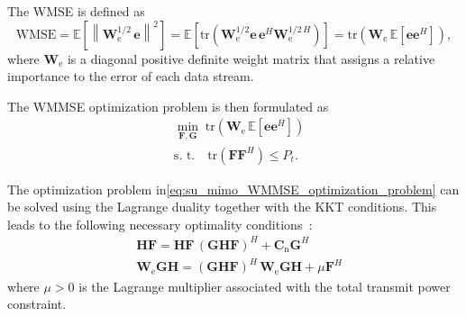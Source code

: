 The \ac{WMSE} is defined as
\begin{equation}
\label{eq:wmse_matrix}
    \text{WMSE} 
    = \mathbb{E}\!\left[ \left\|\mathbf{W}^{1/2}_{\mathrm{e}} \, \mathbf{e}\right\|^2 \right]
    = \mathbb{E}\!\left[ \mathrm{tr}(\mathbf{W}^{1/2}_{\mathrm{e}} \mathbf{e} \, \mathbf{e}^H \mathbf{W}^{1/2 \, H}_{\mathrm{e}}) \right]
    = \mathrm{tr}(\mathbf{W}_{\mathrm{e}} \, \mathbb{E}\!\left[\mathbf{e} \mathbf{e}^H \right]),
\end{equation}
where $\mathbf{W}_{\mathrm{e}}$ is a diagonal positive definite weight matrix that assigns a relative importance to the error of each data stream.

The \ac{WMMSE} optimization problem is then formulated as
\begin{equation}
\label{eq:su_mimo_WMMSE_optimization_problem}
\begin{aligned}
    & \min_{\mathbf{F}, \mathbf{G}} \; \mathrm{tr}(\mathbf{W}_{\mathrm{e}} \, \mathbb{E}\!\left[\mathbf{e} \mathbf{e}^H \right]) \\
    & \text{s. t.} \quad \mathrm{tr}(\mathbf{F}\mathbf{F}^H) \leq P_t.
\end{aligned}
\end{equation}

The optimization problem in\eqref{eq:su_mimo_WMMSE_optimization_problem} can be solved using the Lagrange duality together with the \acf{KKT} conditions.
This leads to the following necessary optimality conditions~\cite{su_mimo_joint_precoder_decoder_design}:
\begin{subequations}
\begin{align}
    & \mathbf{H}\mathbf{F} = \mathbf{H}\mathbf{F} \, (\mathbf{G}\mathbf{H}\mathbf{F})^H + \mathbf{C}_{\mathrm{n}}\mathbf{G}^H \\
    & \mathbf{W}_{\mathrm{e}} \mathbf{G}\mathbf{H} = (\mathbf{G}\mathbf{H}\mathbf{F})^H \, \mathbf{W}_{\mathrm{e}} \mathbf{G}\mathbf{H} + \mu \mathbf{F}^H
\end{align}
\end{subequations}
where $\mu > 0$ is the Lagrange multiplier associated with the total transmit power constraint.

